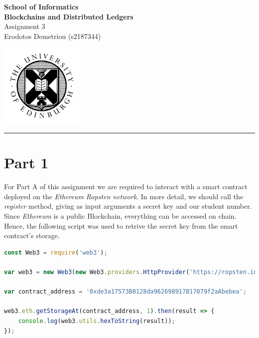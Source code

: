 \documentclass[12pt,a4paper]{article}
\begin{document}
\noindent
\begin{minipage}{120mm}
        {\huge {\bf School of Informatics}}\\
        {\Large {\bf Blockchains and Distributed Ledgers}}\\

        {\Large Assignment 3}\\
        {\normalsize Erodotos Demetriou (s2187344)}
\end{minipage}
\hfill
\begin{minipage}{40mm}              
        \includegraphics[width=40mm]{crest.png}
\end{minipage}

\begin{center}
\rule{\linewidth}{0.5mm}
\end{center}

\section*{Part 1}

For Part A of this assignment we are required to interact with a smart contract
deployed on the \emph{Ethereum Ropsten network}. In more detail, we should call
the \emph{register} method, giving as input arguments a secret key and our student
number. Since \emph{Ethereum} is a public Blockchain, everything can be accessed
on chain. Hence, the following script was used to retrive the secret key from
the smart contract's storage. \\

\begin{lstlisting}[language=JavaScript]
const Web3 = require('web3');

var web3 = new Web3(new Web3.providers.HttpProvider('https://ropsten.infura.io/v3/0ab1814012ad4231965d67bf98a40b1a'));

var contract_address = '0xde3a17573B0128da962698917B17079f2aAbebea';

web3.eth.getStorageAt(contract_address, 1).then(result => {
    console.log(web3.utils.hexToString(result));
});
\end{lstlisting} 
\end{document}
